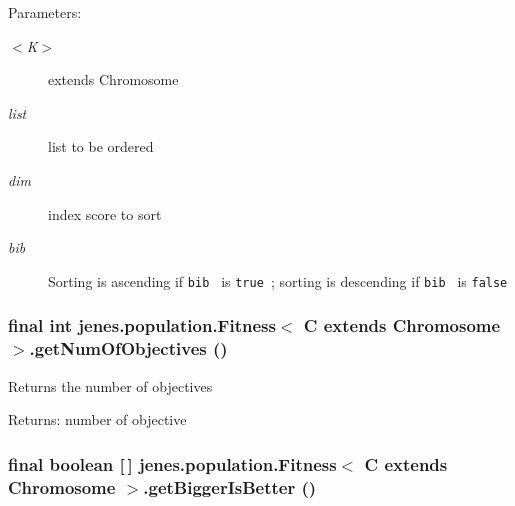 \begin{Desc}
\item[Parameters:]
\begin{description}
\item[{\em $<$K$>$}]extends Chromosome \item[{\em list}]list to be ordered \item[{\em dim}]index score to sort \item[{\em bib}]Sorting is ascending if {\tt  bib } is {\tt  true }; sorting is descending if {\tt  bib } is {\tt  false } \end{description}
\end{Desc}
\hypertarget{classjenes_1_1population_1_1_fitness_3_01_c_01extends_01_chromosome_01_4_2c1cb27db38fde35b764b0bf88e7c7f3}{
\subsubsection[getNumOfObjectives]{\setlength{\rightskip}{0pt plus 5cm}final int jenes.population.Fitness$<$ C extends Chromosome $>$.getNumOfObjectives ()}}
\label{classjenes_1_1population_1_1_fitness_3_01_c_01extends_01_chromosome_01_4_2c1cb27db38fde35b764b0bf88e7c7f3}


Returns the number of objectives

\begin{Desc}
\item[Returns:]number of objective \end{Desc}
\hypertarget{classjenes_1_1population_1_1_fitness_3_01_c_01extends_01_chromosome_01_4_87d1d2a0a3758dbaedd78197c335e6a5}{
\subsubsection[getBiggerIsBetter]{\setlength{\rightskip}{0pt plus 5cm}final boolean \mbox{[}$\,$\mbox{]} jenes.population.Fitness$<$ C extends Chromosome $>$.getBiggerIsBetter ()}}
\label{classjenes_1_1population_1_1_fitness_3_01_c_01extends_01_chromosome_01_4_87d1d2a0a3758dbaedd78197c335e6a5}


